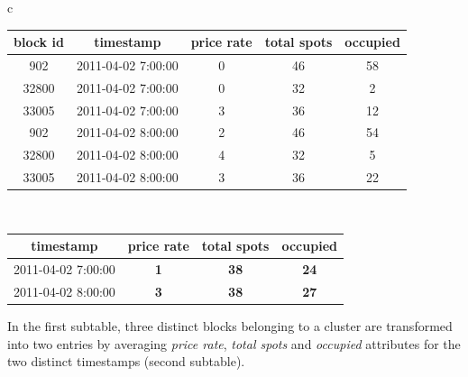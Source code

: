 	\begin{table}
		{\begin{tabular}{ c }
				\begin{tabular}{ | c | c | c | c | c |}
					\hline
					\textbf{block id} & \textbf{timestamp} & \textbf{price rate} & \textbf{total spots} & \textbf{occupied} \\ \hline
					902   & {2011-04-02 7:00:00} & 0 & 46 & 58 \\ \hline
					32800 & {2011-04-02 7:00:00} & 0 & 32 & 2 \\ \hline
					33005 & {2011-04-02 7:00:00} & 3 & 36 & 12 \\ \hline
					902   & {2011-04-02 8:00:00} & 2 & 46 & 54 \\ \hline
					32800 & {2011-04-02 8:00:00} & 4 & 32 & 5 \\ \hline
					33005 & {2011-04-02 8:00:00} & 3 & 36 & 22 \\ \hline
				\end{tabular} \\
				\colrule
				\begin{tabular}{ | c | c | c | c |}
					\hline
					\textbf{timestamp} & \textbf{price rate} & \textbf{total spots} & \textbf{occupied} \\ \hline
					{2011-04-02 7:00:00} & \textbf{1} & \textbf{38} & \textbf{24} \\ \hline
					{2011-04-02 8:00:00} & \textbf{3} & \textbf{38} & \textbf{27} \\ \hline
				\end{tabular}
		\end{tabular}}
		\begin{tabnote}
			In the first subtable, three distinct blocks belonging to a cluster are transformed into two entries by averaging \textit{price rate}, \textit{total spots} and \textit{occupied} attributes for the two distinct timestamps (second subtable).
		\end{tabnote}
		\label{tab:aggregating_datapoints}
	\end{table}
	

